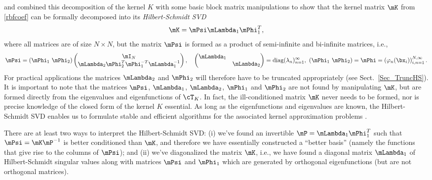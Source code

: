 \cite{FMcC12} and \cite{CFMcC13} combined this decomposition of the kernel $K$ with some basic block matrix manipulations to show that the kernel matrix $\mK$ from \eqref{rbfcoef} can be formally decomposed into its \emph{Hilbert-Schmidt SVD}
\[
\mK = \mPsi \mLambda_1 \mPhi_1^T,
\]
where all matrices are of size $N\times N$, but the matrix $\mPsi$ is formed as a product of semi-infinite and bi-infinite matrices, i.e.,
\begin{equation}\label{StableBasis}
\mPsi = \left(\mPhi_1\ \mPhi_2\right)\left(\begin{matrix}\mI_N\\\mLambda_2\mPhi_2^T\mPhi_1^{-T}\mLambda_1^{-1}\end{matrix}\right),
\quad
\left(\begin{matrix}\mLambda_1 & \\ & \mLambda_2\end{matrix}\right) = \text{diag}(\lambda_n)_{n=1}^\infty,\ \left(\mPhi_1\ \mPhi_2\right) = \mPhi = \left(\varphi_n(\bx_i)\right)_{i,n=1}^{N,\infty}.
\end{equation}
For practical applications the matrices $\mLambda_2$ and $\mPhi_2$ will therefore have to be truncated appropriately (see Sect.~\ref{Sec_TruncHS}). It is important to note that the matrices $\mPsi$, $\mLambda_1$, $\mLambda_2$, $\mPhi_1$ and $\mPhi_2$ are not found by manipulating $\mK$, but are formed directly from the eigenvalues and eigenfunctions of $\cT_K$. In fact, the ill-conditioned matrix $\mK$ never needs to be formed, nor is precise knowledge of the closed form of the kernel $K$ essential. As long as the eigenfunctions and eigenvalues are known, the Hilbert-Schmidt SVD enables us to formulate stable and efficient algorithms for the associated kernel approximation problems \citep{CFMcC13}.

There are at least two ways to interpret the Hilbert-Schmidt SVD:
(i) we've found an invertible $\mP = \mLambda_1\mPhi_1^T$ such that $\mPsi=\mK\mP^{-1}$ is better conditioned than $\mK$, and therefore we have essentially constructed a ``better basis'' (namely the functions that give rise to the columns of $\mPsi$); and
(ii) we've diagonalized the matrix $\mK$, i.e., we have found a diagonal matrix $\mLambda_1$ of Hilbert-Schmidt singular values along with matrices $\mPsi$ and $\mPhi_1$ which are generated by orthogonal eigenfunctions (but are not orthogonal matrices).

